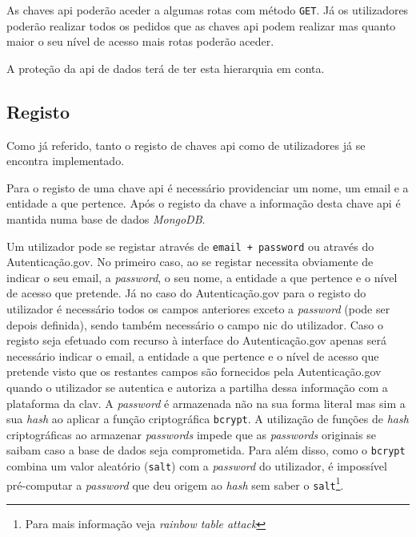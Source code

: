 As chaves \acrshort{api} poderão aceder a algumas rotas com método \texttt{GET}.
Já os utilizadores poderão realizar todos os pedidos que as chaves \acrshort{api} podem realizar mas quanto maior o seu nível de acesso mais rotas poderão aceder.

A proteção da \acrshort{api} de dados terá de ter esta hierarquia em conta.

\subsection{Registo}

Como já referido, tanto o registo de chaves \acrshort{api} como de utilizadores já se encontra implementado.

Para o registo de uma chave \acrshort{api} é necessário providenciar um nome, um email e a entidade a que pertence. Após o registo da chave a informação desta chave \acrshort{api} é mantida numa base de dados \textit{MongoDB}.

Um utilizador pode se registar através de \texttt{email + password} ou através do Autenticação.gov. No primeiro caso, ao se registar necessita obviamente de indicar o seu email, a \textit{password}, o seu nome, a entidade a que pertence e o nível de acesso que pretende. Já no caso do Autenticação.gov para o registo do utilizador é necessário todos os campos anteriores exceto a \textit{password} (pode ser depois definida), sendo também necessário o campo \acrfull{nic} do utilizador. Caso o registo seja efetuado com recurso à interface do Autenticação.gov apenas será necessário indicar o email, a entidade a que pertence e o nível de acesso que pretende visto que os restantes campos são fornecidos pela Autenticação.gov quando o utilizador se autentica e autoriza a partilha dessa informação com a plataforma da \acrshort{clav}.
A \textit{password} é armazenada não na sua forma literal mas sim a sua \textit{hash} ao aplicar a função criptográfica \texttt{bcrypt}. A utilização de funções de \textit{hash} criptográficas ao armazenar \textit{passwords} impede que as \textit{passwords} originais se saibam caso a base de dados seja comprometida. Para além disso, como o \texttt{bcrypt} combina um valor aleatório (\texttt{salt}) com a \textit{password} do utilizador, é impossível pré-computar a \textit{password} que deu origem ao \textit{hash} sem saber o \texttt{salt}\footnote{Para mais informação veja \textit{rainbow table attack}}.

